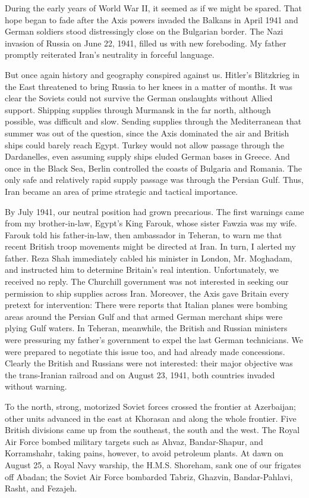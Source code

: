 During the early years of World War II, it seemed as if we might be spared. That hope began to fade after the Axis powers invaded the Balkans in April 1941 and German soldiers stood distressingly close on the Bulgarian border. The Nazi invasion of Russia on June 22, 1941, filled us with new foreboding. My father promptly reiterated Iran's neutrality in forceful language. 

But once again history and geography conspired against us. Hitler's Blitzkrieg in the East threatened to bring Russia to her knees in a matter of months. It was clear the Soviets could not survive the German onslaughts without Allied support. Shipping supplies through Murmansk in the far north, although possible, was difficult and slow. Sending supplies through the Mediterranean that summer was out of the question, since the Axis dominated the air and British ships could barely reach Egypt. Turkey would not allow passage through the Dardanelles, even assuming supply ships eluded German bases in Greece. And once in the Black Sea, Berlin controlled the coasts of Bulgaria and Romania. The only safe and relatively rapid supply passage was through the Persian Gulf. Thus, Iran became an area of prime strategic and tactical importance. 

By July 1941, our neutral position had grown precarious. The first warnings came from my brother-in-law, Egypt's King Farouk, whose sister Fawzia was my wife. Farouk told his father-in-law, then ambassador in Teheran, to warn me that recent British troop movements might be directed at Iran. In turn, I alerted my father. Reza Shah immediately cabled his minister in London, Mr. Moghadam, and instructed him to determine Britain's real intention. Unfortunately, we received no reply. The Churchill government was not interested in seeking our permission to ship supplies across Iran. Moreover, the Axis gave Britain every pretext for intervention: There were reports that Italian planes were bombing areas around the Persian Gulf and that armed German merchant ships were plying Gulf waters. In Teheran, meanwhile, the British and Russian ministers were pressuring my father's government to expel the last German technicians. We were prepared to negotiate this issue too, and had already made concessions. Clearly the British and Russians were not interested: their major objective was the trans-Iranian railroad and on August 23, 1941, both countries invaded without warning. 


To the north, strong, motorized Soviet forces crossed the frontier at Azerbaijan; other units advanced in the east at Khorasan and along the whole frontier. Five British divisions came up from the southeast, the south and the west. The Royal Air Force bombed military targets such as Ahvaz, Bandar-Shapur, and Korramshahr, taking pains, however, to avoid petroleum plants. At dawn on August 25, a Royal Navy warship, the H.M.S. Shoreham, sank one of our frigates off Abadan; the Soviet Air Force bombarded Tabriz, Ghazvin, Bandar-Pahlavi, Rasht, and Fezajeh. 

